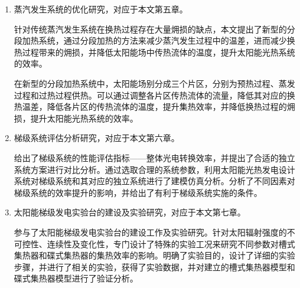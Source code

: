 \begin{enumerate}[label=(\arabic*)]
	\item 蒸汽发生系统的优化研究，对应于本文第五章。
	
	针对传统蒸汽发生系统在换热过程存在大量㶲损的缺点，本文提出了新型的分段加热系统，通过分段加热的方法来减少蒸汽发生过程中的温差，进而减少换热过程带来的㶲损，并降低太阳能场中传热流体的温度，提升太阳能光热系统的效率。
	
	在新型的分段加热系统中，太阳能场别分成三个片区，分别为预热过程、蒸发过程和过热过程供热。可以通过调整各片区传热流体的流量，降低其对应的换热温差，降低各片区的传热流体的温度，提升集热效率，并降低换热过程的㶲损，提升太阳能光热系统的效率。

	\item 梯级系统评估分析研究，对应于本文第六章。
	
	给出了梯级系统的性能评估指标——整体光电转换效率，并提出了合适的独立系统方案进行对比分析。通过选取合理的系统参数，利用太阳能光热发电设计系统对梯级系统和其对应的独立系统进行了建模仿真分析。分析了不同因素对梯级系统的效率提升的影响，并给出了有利于梯级系统实施的条件。

	\item 太阳能梯级发电实验台的建设及实验研究，对应于本文第七章。
	
	参与了太阳能梯级发电实验台的建设工作及实验研究。针对太阳辐射强度的不可控性、连续性及变化性，专门设计了特殊的实验工况来研究不同参数对槽式集热器和碟式集热器的集热效率的影响。明确了实验目的，设计了详细的实验步骤，并进行了相关的实验，获得了实验数据，并对建立的槽式集热器模型和碟式集热器模型进行了验证分析。
\end{enumerate}
